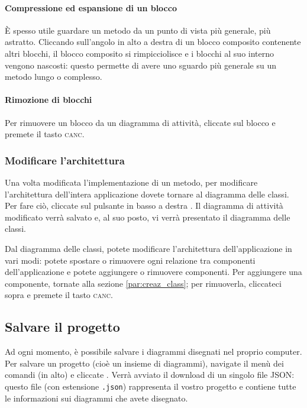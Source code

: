 \paragraph{Compressione ed espansione di un blocco} È spesso utile guardare un metodo da un punto di vista più generale, più astratto. Cliccando sull'angolo in alto a destra di un blocco composito contenente altri blocchi, il blocco composito si rimpicciolisce e i blocchi al suo interno vengono nascosti: questo permette di avere uno sguardo più generale su un metodo lungo o complesso.

\paragraph{Rimozione di blocchi} Per rimuovere un blocco da un diagramma di attività, cliccate sul blocco e premete il tasto \textsc{canc}. %

\subsubsection{Modificare l'architettura}
Una volta modificata l'implementazione di un metodo, per modificare l'architettura dell'intera applicazione dovete tornare al diagramma delle classi. Per fare ciò, cliccate sul pulsante in basso a destra . Il diagramma di attività modificato verrà salvato e, al suo posto, vi verrà presentato il diagramma delle classi.

Dal diagramma delle classi, potete modificare l'architettura dell'applicazione in vari modi: potete spostare o rimuovere ogni relazione tra componenti dell'applicazione e potete aggiungere o rimuovere componenti. Per aggiungere una componente, tornate alla sezione \ref{par:creaz_class}; per rimuoverla, cliccateci sopra e premete il tasto \textsc{canc}.%



\subsection{Salvare il progetto} \label{sec:save}

Ad ogni momento, è possibile salvare i diagrammi disegnati nel proprio computer. Per salvare un progetto (cioè un insieme di diagrammi), navigate il menù dei comandi (in alto) e cliccate . Verrà avviato il download di un singolo file JSON: questo file (con estensione \texttt{.json}) rappresenta il vostro progetto e contiene tutte le informazioni sui diagrammi che avete disegnato.



